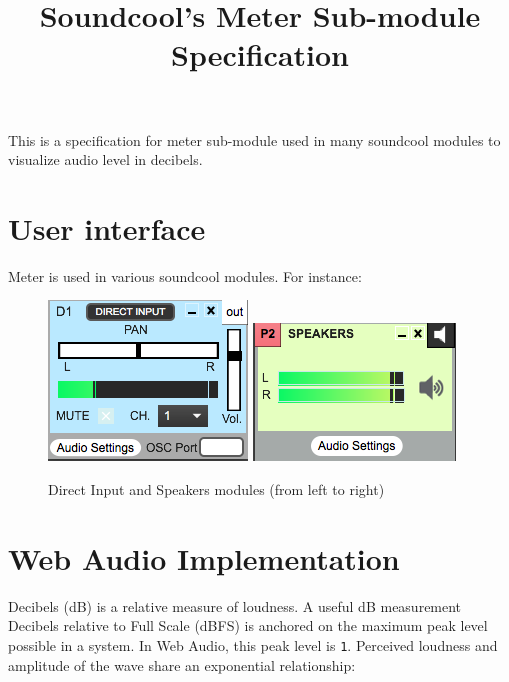\documentclass[20pt]{article}
\begin{document}
\title{Soundcool's Meter Sub-module Specification}
\maketitle

This is a specification for meter sub-module used in many soundcool modules to visualize audio level in decibels.
\section*{User interface}
Meter is used in various soundcool modules. For instance:


\begin{figure}[htp]

\centering
\includegraphics[scale=0.5]{directin.png} 
\includegraphics[scale=0.5]{speakers.png} 
\caption{Direct Input and Speakers modules (from left to right)}
\label{fig:figure3}
\end{figure}

\section*{Web Audio Implementation}
Decibels (dB) is a relative measure of loudness. A useful dB measurement Decibels relative to Full Scale (dBFS) is anchored on the maximum peak level possible in a system. In Web Audio, this peak level is \texttt{1}. Perceived loudness and amplitude of the wave share an exponential relationship:
\end{document}
